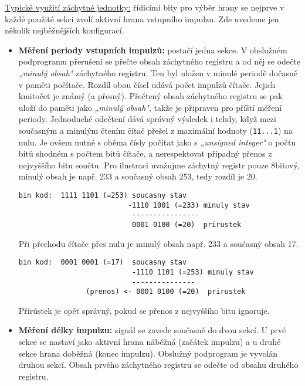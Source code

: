         \underline{Typické využití záchytné jednotky:}
        řídicími bity pro výběr hrany se nejprve v každé použité sekci zvolí aktivní hrana 
        vstupního impulzu. Zde uvedeme jen několik nejběžnějších konfigurací.
        \begin{itemize}[noitemsep]
          \item \textbf{Měření periody vstupních impulzů:} postačí jedna sekce. V obslužném  
                podprogramu přerušení se přečte obsah záchytného registru a od něj se odečte 
                \emph{„minulý obsah"} záchytného registru. Ten byl uložen v minulé periodě dočasně 
                v paměti počítače. Rozdíl obou čísel udává počet impulzů čítače. Jejich kmitočet je 
                známý (a přesný). Přečtený obsah záchytného registru se pak uloží do paměti jako 
                \emph{„minulý obsah"}, takže je připraven pro příští měření periody. Jednoduché 
                odečtení dává správný výsledek i tehdy, když mezi současným a minulým čtením čítač 
                přešel z maximální hodnoty (\texttt{11...1}) na nulu. Je ovšem nutné s oběma čísly 
                počítat jako s \emph{„unsigned integer"} o počtu bitů shodném s počtem bitů čítače, 
                a nerespektovat případný přenos z nejvyššího bitu součtu. Pro ilustraci uvažujme 
                záchytný registr pouze 8bitový, minulý obsah je např. 233 a současný obsah 253, 
                tedy rozdíl je 20.
                \begin{lstlisting}[style=luaMITASMStyle, numbers=none, gobble=16]
                 bin kod:  1111 1101 (=253) soucasny stav
                          -1110 1001 (=233) minuly stav
                           ----------------
                           0001 0100 (=20)  prirustek
                \end{lstlisting}
                Při přechodu čítače přes nulu je minulý obsah např. 233 a současný obsah 17.
                \begin{lstlisting}[style=luaMITASMStyle, numbers=none, gobble=16]
                  bin kod:  0001 0001 (=17)  soucasny stav
                           -1110 1101 (=253) minuly stav
                           ---------------
                (prenos) <- 0001 0100 (=20)  prirustek
                \end{lstlisting}
                Přírůstek je opět správný, pokud se přenos z nejvyššího bitu ignoruje.
                           
          \item \textbf{Měření délky impulzu:}  signál se zavede současně do dvou sekcí. U prvé  
                sekce se nastaví jako aktivní hrana náběžná (začátek impulzu) a u druhé sekce 
                hrana doběžná (konec impulzu). Obslužný podprogram je vyvolán druhou sekcí. Obsah 
                prvého záchytného registru se odečte od obsahu druhého registru.
          

\end{itemize}
